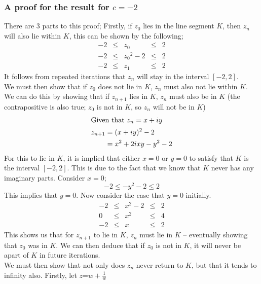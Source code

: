 \documentclass[12pt]{article}
\begin{document}
\subsubsection{A proof for the result for $c = -2$}
There are 3 parts to this proof;
Firstly, if $z_0$ lies in the line segment $K$, then $z_n$ will also lie within $K$, this can be shown by the following;
\begin{equation*}
	\begin{array}{ccccc}
	-2 & \le & z_0 & \le & 2 \\[2pt]
	-2  & \le &  {z_0}^2-2  & \le & 2 \\[2pt]
	-2 & \le &   z_1   & \le & 2
	\end{array}
\end{equation*}
It follows from repeated iterations that $z_n$ will stay in the interval $[-2,2]$. \\
We must then show that if $z_0$ does not lie in $K$, $z_n$ must also not lie within $K$. We can do this by showing that if $z_{n+1}$ lies in $K$, $z_n$ must also be in $K$ (the contrapositive is also true; $z_0$ is not in $K$, so $z_n$ will not be in $K$)
\begin{align*}
	\shortintertext{Given that $z_n = x+iy$}
	z_{n+1} & = (x+iy)^2-2     \\
	        & = x^2+2ixy-y^2-2
\end{align*}
For this to lie in $K$, it is implied that either $x=0$ or $y=0$ to satisfy that $K$ is the interval $[-2,2]$. This is due to the fact that we know that $K$ never has any imaginary parts.
Consider $x=0$;
\[-2\le -y^2-2 \le 2\]
This implies that $y=0$. Now consider the case that $y=0$ initially.
\begin{equation*}
	\begin{array}{ccccc}
		-2 & \le & x^2-2 & \le & 2 \\[2pt]
		0  & \le &  x^2  & \le & 4 \\[2 pt]
		-2 & \le &   x   & \le & 2
	\end{array}
\end{equation*}
This shows us that for $z_{n+1}$ to lie in $K$, $z_n$ must lie in $K$ -- eventually showing that $z_0$ was in $K$. We can then deduce that if $z_0$ is not in $K$, it will never be apart of $K$ in future iterations.\\
We must then show that not only does $z_n$ never return to $K$, but that it tends to infinity also.
Firstly, let $z$=$w+\frac{1}{w}$
\end{document}

